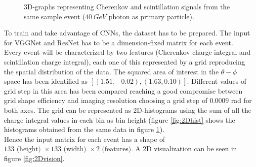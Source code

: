 \begin{figure}
	\centering
	 \quad
	\caption{3D-graphs representing Cherenkov and scintillation signals from the same sample event ($40\ GeV$ photon as primary particle).}
	\label{fig:3Dgraph}
\end{figure}

To train and take advantage of CNNs, the dataset has to be prepared. The input for VGGNet and ResNet has to be a dimension-fixed matrix for each event. Every event will be characterized by two features (Cherenkov charge integral and scintillation charge integral), each one of this represented by a grid reproducing the spatial distribution of the data. The squared area of interest in the $\theta-\phi$ space has been identified as $[(1.51,-0.02),(1.63,0.10)]$. Different values of grid step in this area has been compared reaching a good compromise between grid shape efficiency and imaging resolution choosing a grid step of $0.0009$ rad for both axes. The grid can be represented as 2D-histograms using the sum of all the charge integral values in each bin as bin height (figure \ref{fig:2Dhist} shows the histograms obtained from the same data in figure \ref{fig:3Dgraph}).\\
Hence the input matrix for each event has a shape of $133 \text{ (height) }\times 133\text{ (width) }\times 2\text{ (features)}$. A 2D visualization can be seen in figure \ref{fig:2Dvision}.\\

